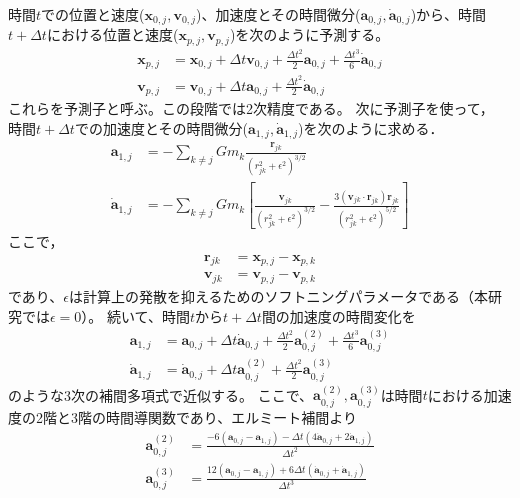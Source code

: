 \documentclass[a4paper,10pt,oneside,twocolumn,notitlepage,final]{jarticle}
\begin{document}
時間$t$での位置と速度(${\bm x}_{0,j},{\bm v}_{0,j}$)、加速度とその時間微分(${\bm a}_{0,j},\dot{{\bm a}}_{0,j}$)から、時間$t + \Delta t$における位置と速度(${\bm x}_{p,j} , {\bm v}_{p,j}$)を次のように予測する。
\begin{align}
{\bm x}_{p,j} &= {\bm x}_{0,j} + \Delta t {\bm v}_{0,j} + \frac{\Delta t ^2}{2} {\bm a}_{0,j} + \frac{\Delta t ^3}{6} \dot{{\bm a}}_{0,j}\\
{\bm v}_{p,j} &= {\bm v}_{0,j} + \Delta t {\bm a}_{0,j} + \frac{\Delta t ^2}{2} \dot{{\bm a}}_{0,j}
\end{align}
これらを予測子と呼ぶ。この段階では2次精度である。
次に予測子を使って， 時間$t + \Delta t$での加速度とその時間微分(${\bm a}_{1,j},\dot{{\bm a}}_{1,j}$)を次のように求める．
\begin{align}
{\bm a}_{1,j} &= - \sum_{k \not= j} G m_k \frac{{\bm r}_{jk}}{(r_{jk}^2 + \epsilon^2)^{3/2}}\label{eq:a1j}\\
\dot{{\bm a}}_{1,j} &= - \sum_{k \not= j} G m_k \left[ \frac{{\bm v}_{jk}}{(r_{jk}^2 + \epsilon^2)^{3/2}} - \frac{3 ( {\bm v}_{jk} \cdot {\bm r}_{jk} ) {\bm r}_{jk} }{(r_{jk}^2 + \epsilon^2)^{5/2}} \right]\label{eq:a2j}
\end{align}
ここで，
\begin{align}
{\bm r}_{jk} &= {\bm x}_{p,j} - {\bm x}_{p,k}\\
{\bm v}_{jk} &= {\bm v}_{p,j} - {\bm v}_{p,k} 
\end{align}
であり、$\epsilon$は計算上の発散を抑えるためのソフトニングパラメータである（本研究では$\epsilon=0$）。
続いて、時間$t$から$t+\Delta t$間の加速度の時間変化を
\begin{align}
{\bm a}_{1,j} &= {\bm a}_{0,j} + \Delta t \dot{{\bm a}}_{0,j} + \frac{\Delta t ^2}{2} {\bm a}_{0,j}^{(2)} + \frac{\Delta t ^3}{6} {\bm a}_{0,j}^{(3)} \label{eq:a1j}\\
\dot{{\bm a}}_{1,j} &= \dot{{\bm a}}_{0,j} + \Delta t {\bm a}_{0,j}^{(2)} + \frac{\Delta t ^2}{2} {\bm a}_{0,j}^{(3)} \label{eq:adot1j}
\end{align}
のような3次の補間多項式で近似する。
ここで、${\bm a}_{0,j}^{(2)},{\bm a}_{0,j}^{(3)}$は時間$t$における加速度の2階と3階の時間導関数であり、エルミート補間より
\begin{align}
{\bm a}_{0,j}^{(2)} &= \frac{- 6 ({\bm a}_{0,j} - {\bm a}_{1,j}) - \Delta t (4 \dot{{\bm a}}_{0,j} + 2 \dot{{\bm a}}_{1,j})}{\Delta t ^2}\\
{\bm a}_{0,j}^{(3)} &= \frac{12 ({\bm a}_{0,j} - {\bm a}_{1,j}) + 6 \Delta t (\dot{{\bm a}}_{0,j} + \dot{{\bm a}}_{1,j})}{\Delta t ^3}
\end{align}
\end{document}
